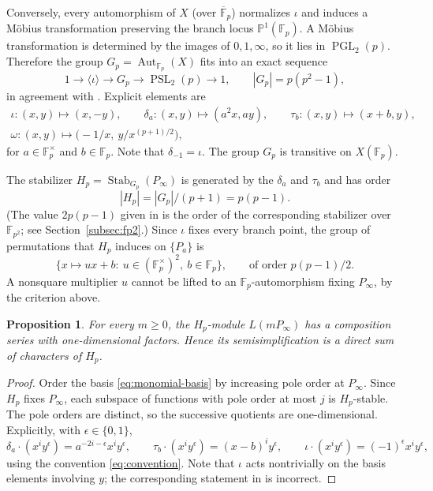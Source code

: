 \documentclass[12pt,letterpaper]{article}
\newtheorem{proposition}[theorem]{Proposition}
\theoremstyle{definition}
\theoremstyle{remark}
\numberwithin{equation}{section}
\newcommand{\F}{\mathbb{F}}
\newcommand{\PP}{\mathbb{P}}
\newcommand{\Aut}{\operatorname{Aut}}
\newcommand{\Stab}{\operatorname{Stab}}
\newcommand{\PSL}{\operatorname{PSL}}
\newcommand{\PGL}{\operatorname{PGL}}
\begin{document}
Conversely, every automorphism of $X$ (over $\overline{\F}_p$) normalizes
$\iota$ and induces a M\"obius transformation preserving the branch locus
$\PP^1(\F_p)$.  A M\"obius transformation is determined by the images of
$0,1,\infty$, so it lies in $\PGL_2(p)$.  Therefore the group
$G_p=\Aut_{\F_p}(X)$ fits into an exact sequence
\[
1\to\langle\iota\rangle\to G_p\to\PSL_2(p)\to1,
\qquad |G_p|=p(p^2-1),
\]
in agreement with \cite{BrS86,Go03}.  Explicit elements are
\begin{equation}\label{eq:generators}
\begin{gathered}
\iota:(x,y)\mapsto(x,-y),\qquad
\delta_a:(x,y)\mapsto(a^2x,ay),\qquad
\tau_b:(x,y)\mapsto(x+b,y),\\
\omega:(x,y)\mapsto\bigl(-1/x,\ y/x^{(p+1)/2}\bigr),
\end{gathered}
\end{equation}
for $a\in\F_p^\times$ and $b\in\F_p$.  Note that $\delta_{-1}=\iota$.
The group $G_p$ is transitive on $X(\F_p)$.

The stabilizer $H_p=\Stab_{G_p}(P_\infty)$ is generated by the
$\delta_a$ and $\tau_b$ and has order
\begin{equation}\label{eq:Hp-order}
|H_p|=|G_p|/(p+1)=p(p-1).
\end{equation}
(The value $2p(p-1)$ given in \cite{Jo05} is the order of the
corresponding stabilizer over $\F_{p^2}$; see
Section~\ref{subsec:fp2}.)  Since $\iota$ fixes every branch point, the
group of permutations that $H_p$ induces on $\{P_a\}$ is
\begin{equation}\label{eq:square-affine}
\{x\mapsto ux+b:\ u\in(\F_p^\times)^2,\ b\in\F_p\},
\qquad\text{of order }p(p-1)/2.
\end{equation}
A nonsquare multiplier $u$ cannot be lifted to an $\F_p$-automorphism
fixing $P_\infty$, by the criterion above.

\begin{proposition}\label{prop:H-comp}
For every $m\ge0$, the $H_p$-module $L(mP_\infty)$ has a composition
series with one-dimensional factors.  Hence its semisimplification is a
direct sum of characters of $H_p$.
\end{proposition}
\begin{proof}
Order the basis \eqref{eq:monomial-basis} by increasing pole order at
$P_\infty$.  Since $H_p$ fixes $P_\infty$, each subspace of functions with
pole order at most $j$ is $H_p$-stable.  The pole orders are distinct, so
the successive quotients are one-dimensional.  Explicitly, with
$\epsilon\in\{0,1\}$,
\[
\delta_a\cdot(x^iy^\epsilon)=a^{-2i-\epsilon}x^iy^\epsilon,\qquad
\tau_b\cdot(x^iy^\epsilon)=(x-b)^iy^\epsilon,\qquad
\iota\cdot(x^iy^\epsilon)=(-1)^\epsilon x^iy^\epsilon,
\]
using the convention \eqref{eq:convention}.  Note that $\iota$ acts
nontrivially on the basis elements involving $y$; the corresponding
statement in \cite{Jo05} is incorrect.
\end{proof}
\end{document}
